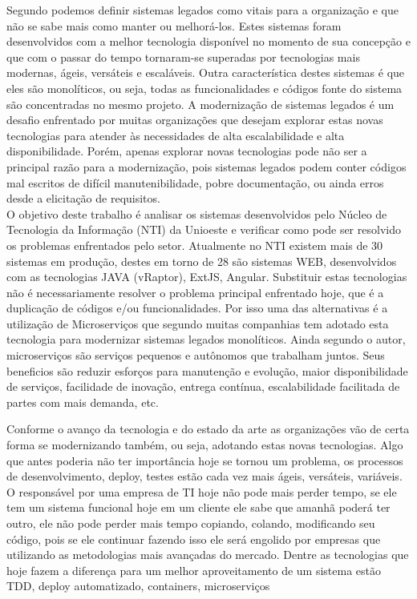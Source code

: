 \documentclass[12pt]{article}
\begin{document}
\cite{Dragoni2017} 

Segundo \cite{Bennett} podemos definir sistemas legados como vitais para a organização e que não se sabe mais como manter ou melhorá-los. Estes sistemas foram desenvolvidos com a melhor tecnologia disponível no momento de sua concepção e que com o passar do tempo tornaram-se superadas por tecnologias mais modernas, ágeis, versáteis e escaláveis. Outra característica destes sistemas é que eles são monolíticos, ou seja, todas as funcionalidades e códigos fonte do sistema são concentradas no mesmo projeto. A modernização de sistemas legados é um desafio enfrentado por muitas organizações que desejam explorar estas novas tecnologias para atender às necessidades de alta escalabilidade e alta disponibilidade\cite{Furda2018}. Porém, apenas explorar novas tecnologias pode não ser a principal razão para a modernização, pois sistemas legados podem conter códigos mal escritos de difícil manutenibilidade, pobre documentação, ou ainda erros desde a elicitação de requisitos.  \\
O objetivo deste trabalho é analisar os sistemas desenvolvidos pelo Núcleo de Tecnologia da Informação (NTI) da Unioeste e verificar como pode ser resolvido os problemas enfrentados pelo setor. Atualmente no NTI existem mais de 30 sistemas em produção, destes em torno de 28 são sistemas WEB, desenvolvidos com as tecnologias JAVA (vRaptor), ExtJS, Angular. Substituir estas tecnologias não é necessariamente resolver o problema principal enfrentado hoje, que é a duplicação de códigos e/ou funcionalidades. Por isso uma das alternativas é a utilização de Microserviços que segundo \cite{Carvalho2019} muitas companhias tem adotado esta tecnologia  para modernizar sistemas legados monolíticos. Ainda segundo o autor, microserviços são serviços pequenos e autônomos que trabalham juntos. Seus beneficios são reduzir esforços para manutenção e evolução, maior disponibilidade de serviços, facilidade de inovação, entrega contínua, escalabilidade facilitada de partes com mais demanda, etc.

Conforme o avanço da tecnologia e do estado da arte as organizações vão de certa forma se modernizando também, ou seja, adotando estas novas tecnologias. Algo que antes poderia não ter importância hoje se tornou um problema, os processos de desenvolvimento, deploy, testes estão cada vez mais ágeis, versáteis, variáveis. O responsável por uma empresa de TI hoje não pode mais perder tempo, se ele tem um sistema funcional hoje em um cliente ele sabe que amanhã poderá ter outro, ele não pode perder mais tempo copiando, colando, modificando seu código, pois se ele continuar fazendo isso ele será engolido por empresas que utilizando as metodologias mais avançadas do mercado. Dentre as tecnologias que hoje fazem a diferença para um melhor aproveitamento de um sistema estão TDD, deploy automatizado, containers, microserviços
\end{document}
